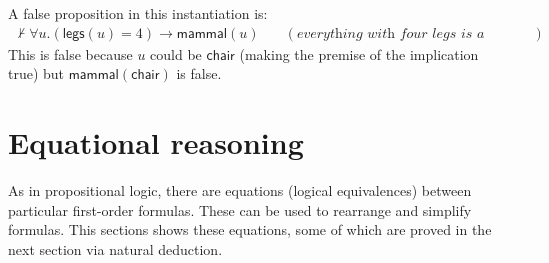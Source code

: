 A false proposition in this instantiation is:
%
\begin{align*}
  \not\vdash \forall u . (\mathsf{legs}(u) = 4) \rightarrow \mathsf{mammal}(u)
& \quad (\textit{everything with four legs is a mammal})
\end{align*}
%
This is false because $u$ could be $\mathsf{chair}$ (making the
premise of the implication true) but
$\mathsf{mammal}(\mathsf{chair})$ is false.

\section{Equational reasoning}
\label{sec:fo-eqn-reasoning}

As in propositional logic, there are equations (logical
equivalences) between particular first-order formulas. These can be used to
rearrange and simplify formulas. This sections shows
these equations, some of which are proved
in the next section via natural deduction.

